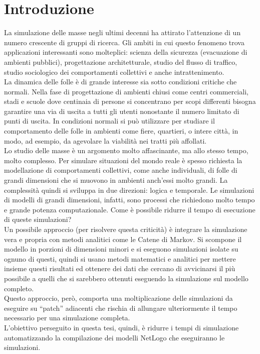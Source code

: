 \chapter{Introduzione}
La simulazione delle masse negli ultimi decenni ha attirato l'attenzione di un numero crescente di gruppi di ricerca. Gli ambiti in cui questo fenomeno trova applicazioni interessanti sono molteplici: scienza della sicurezza (evacuazione di ambienti pubblici), progettazione architetturale, studio del flusso di traffico, studio sociologico dei comportamenti collettivi e anche intrattenimento.\\
La dinamica delle folle è di grande interesse sia sotto condizioni critiche che normali. Nella fase di progettazione di ambienti chiusi come centri commerciali, stadi e scuole dove centinaia di persone si concentrano per scopi differenti bisogna garantire una via di uscita a tutti gli utenti nonostante il numero limitato di punti di uscita. In condizioni normali si può utilizzare per studiare il comportamento delle folle in ambienti come fiere, quartieri, o intere città, in modo, ad esempio, da agevolare la viabilità nei tratti più affollati.\\
Lo studio delle masse è un argomento molto affascinante, ma allo stesso tempo, molto complesso. Per simulare situazioni del mondo reale è spesso richiesta la modellazione di comportamenti collettivi, come anche individuali, di folle di grandi dimensioni che si muovono in ambienti anch'essi molto grandi. La complessità quindi si sviluppa in due direzioni: logica e temporale. Le simulazioni di modelli di grandi dimensioni, infatti, sono processi che richiedono molto tempo e grande potenza computazionale. Come è possibile ridurre il tempo di esecuzione di queste simulazioni? \\
Un possibile approccio (per risolvere questa criticità) è integrare la simulazione vera e propria con metodi analitici come le Catene di Markov. Si scompone il modello in porzioni di dimensioni minori e si eseguono simulazioni isolate su ognuno di questi, quindi si usano metodi matematici e analitici per mettere insieme questi risultati ed ottenere dei dati che cercano di avvicinarsi il più possibile a quelli che si sarebbero ottenuti eseguendo la simulazione sul modello completo.\\
Questo approccio, però, comporta una moltiplicazione delle simulazioni da eseguire su “patch” adiacenti che rischia di allungare ulteriormente il tempo necessario per una simulazione completa.\\
L'obiettivo perseguito in questa tesi, quindi, è ridurre i tempi di simulazione automatizzando la compilazione dei modelli NetLogo che eseguiranno le simulazioni.\\
